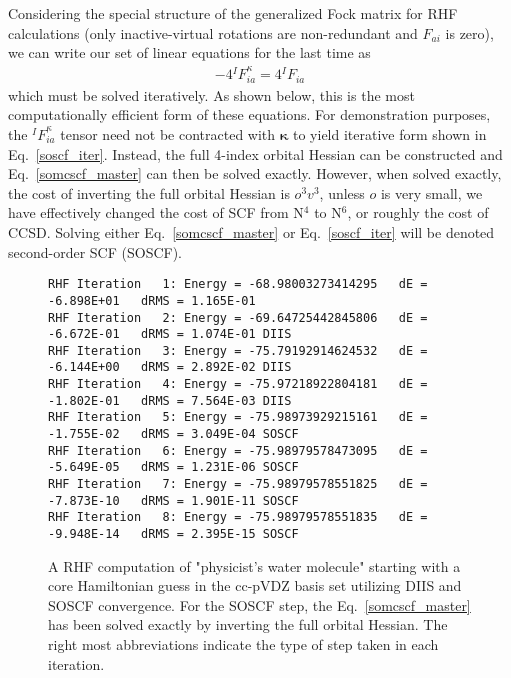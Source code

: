 \documentclass[aip,jcp,preprint,superscriptaddress,floatfix]{revtex4-1}
\begin{document}
Considering the special structure of the generalized Fock matrix for RHF calculations (only inactive-virtual rotations are non-redundant and  $F_{ai}$ is zero), we can write our set of linear equations for the last time as
\begin{eqnarray}
\label{soscf_iter}
-4 {^IF}^{\kappa}_{ia} = 4 {^IF}_{ia}
\end{eqnarray}
which must be solved iteratively.
As shown below, this is the most computationally efficient form of these equations.
For demonstration purposes, the ${^IF}^{\kappa}_{ia}$ tensor need not be contracted with ${\bm \kappa}$ to yield iterative form shown in Eq.~\ref{soscf_iter}.
Instead, the full 4-index orbital Hessian can be constructed and Eq.~\ref{somcscf_master} can then be solved exactly.
However, when solved exactly, the cost of inverting the full orbital Hessian is $o^3v^3$, unless $o$ is very small, we have effectively changed the cost of SCF from N$^4$ to N$^6$, or roughly the cost of CCSD.
Solving either Eq.~\ref{somcscf_master} or Eq.~\ref{soscf_iter} will be denoted second-order SCF (SOSCF). 

\begin{figure}[htbp]
\begin{center}
\caption{A RHF computation of "physicist's water molecule" starting with a core Hamiltonian guess in the cc-pVDZ basis set utilizing DIIS and SOSCF convergence. For the SOSCF step, the Eq.~\ref{somcscf_master} has been solved exactly by inverting the full orbital Hessian. The right most abbreviations indicate the type of step taken in each iteration.}
\label{rhf_water_soscf}
{\footnotesize\linespread{1}\normalfont\ttfamily
\begin{verbatim}
RHF Iteration   1: Energy = -68.98003273414295   dE = -6.898E+01   dRMS = 1.165E-01
RHF Iteration   2: Energy = -69.64725442845806   dE = -6.672E-01   dRMS = 1.074E-01 DIIS
RHF Iteration   3: Energy = -75.79192914624532   dE = -6.144E+00   dRMS = 2.892E-02 DIIS
RHF Iteration   4: Energy = -75.97218922804181   dE = -1.802E-01   dRMS = 7.564E-03 DIIS
RHF Iteration   5: Energy = -75.98973929215161   dE = -1.755E-02   dRMS = 3.049E-04 SOSCF
RHF Iteration   6: Energy = -75.98979578473095   dE = -5.649E-05   dRMS = 1.231E-06 SOSCF
RHF Iteration   7: Energy = -75.98979578551825   dE = -7.873E-10   dRMS = 1.901E-11 SOSCF
RHF Iteration   8: Energy = -75.98979578551835   dE = -9.948E-14   dRMS = 2.395E-15 SOSCF
\end{verbatim}}
\end{center}
\end{figure}
\end{document}
